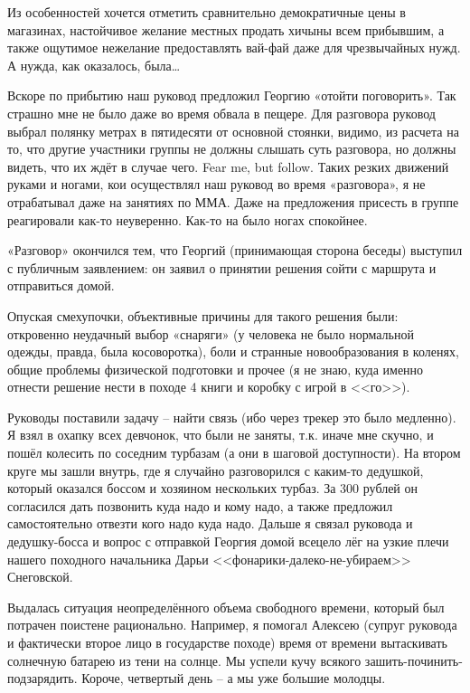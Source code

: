 Из особенностей хочется отметить сравнительно демократичные цены в магазинах, настойчивое желание местных продать хичыны всем прибывшим, а также ощутимое нежелание предоставлять вай-фай даже для чрезвычайных нужд. А нужда, как оказалось, была…

Вскоре по прибытию наш руковод предложил Георгию «отойти поговорить». Так страшно мне не было даже во время обвала в пещере. Для разговора руковод выбрал полянку метрах в пятидесяти от основной стоянки, видимо, из расчета на то, что другие участники группы не должны слышать суть разговора, но должны видеть, что их ждёт в случае чего. Fear me, but follow.
Таких резких движений руками и ногами, кои осуществлял наш руковод во время «разговора», я не отрабатывал даже на занятиях по ММА. Даже на предложения присесть в группе реагировали как-то неуверенно. Как-то на было ногах спокойнее.

«Разговор» окончился тем, что Георгий (принимающая сторона беседы) выступил с публичным заявлением: он заявил о принятии решения сойти с маршрута и отправиться домой.

Опуская смехупочки, объективные причины для такого решения были: откровенно неудачный выбор «снаряги» (у человека не было нормальной одежды, правда, была косоворотка), боли и странные новообразования в коленях, общие проблемы физической подготовки и прочее (я не знаю, куда именно отнести решение нести в походе 4 книги и коробку с игрой в <<го>>).

Руководы поставили задачу – найти связь (ибо через трекер это было медленно). Я взял в охапку всех девчонок, что были не заняты, т.к. иначе мне скучно, и пошёл колесить по соседним турбазам (а они в шаговой доступности). На втором круге мы зашли внутрь, где я случайно разговорился с каким-то дедушкой, который оказался боссом и хозяином нескольких турбаз. За 300 рублей он согласился дать позвонить куда надо и кому надо, а также предложил самостоятельно отвезти кого надо куда надо. Дальше я связал руковода и дедушку-босса и вопрос с отправкой Георгия домой всецело лёг на узкие плечи нашего походного начальника Дарьи <<фонарики-далеко-не-убираем>> Снеговской.

Выдалась ситуация неопределённого объема свободного времени, который был потрачен поистене рационально. Например, я помогал Алексею (супруг руковода и фактически второе лицо в государстве походе) время от времени вытаскивать солнечную батарею из тени на солнце. Мы успели кучу всякого зашить-починить-подзарядить. Короче, четвертый день – а мы уже большие молодцы.

